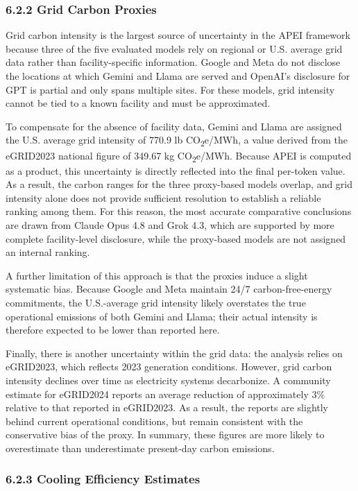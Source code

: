 \documentclass[11pt]{article}
\newcommand{\cotwo}{CO\textsubscript{2}}     %
\begin{document}
\subsubsection*{6.2.2 Grid Carbon Proxies}

Grid carbon intensity is the largest source of uncertainty in the APEI framework because three of the five evaluated models rely on regional or U.S. average grid data rather than facility-specific information. Google and Meta do not disclose the locations at which Gemini and Llama are served and OpenAI's disclosure for GPT is partial and only spans multiple sites. For these models, grid intensity cannot be tied to a known facility and must be approximated.

To compensate for the absence of facility data, Gemini and Llama are assigned the U.S. average grid intensity of 770.9 lb \cotwo e/MWh, a value derived from the eGRID2023 national figure of 349.67 kg \cotwo e/MWh. Because APEI is computed as a product, this uncertainty is directly reflected into the final per-token value. As a result, the carbon ranges for the three proxy-based models overlap, and grid intensity alone does not provide sufficient resolution to establish a reliable ranking among them. For this reason, the most accurate comparative conclusions are drawn from Claude Opus 4.8 and Grok 4.3, which are supported by more complete facility-level disclosure, while the proxy-based models are not assigned an internal ranking.

A further limitation of this approach is that the proxies induce a slight systematic bias. Because Google and Meta maintain 24/7 carbon-free-energy commitments, the U.S.-average grid intensity likely overstates the true operational emissions of both Gemini and Llama; their actual intensity is therefore expected to be lower than reported here.

Finally, there is another uncertainty within the grid data: the analysis relies on eGRID2023, which reflects 2023 generation conditions. However, grid carbon intensity declines over time as electricity systems decarbonize. A community estimate for eGRID2024 reports an average reduction of approximately 3\% relative to that reported in eGRID2023. As a result, the reports are slightly behind current operational conditions, but remain consistent with the conservative bias of the proxy. In summary, these figures are more likely to overestimate than underestimate present-day carbon emissions.

\subsubsection*{6.2.3 Cooling Efficiency Estimates}
\end{document}

